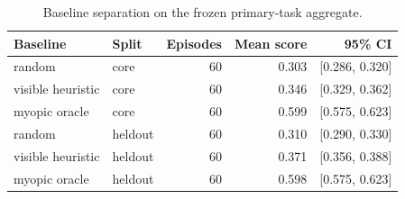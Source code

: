 \begin{table}[t]
  \centering
  \small
  \begin{tabular}{llrrr}
    \toprule
    Baseline & Split & Episodes & Mean score & 95\% CI \\
    \midrule
    random & core & 60 & 0.303 & [0.286, 0.320] \\
    visible heuristic & core & 60 & 0.346 & [0.329, 0.362] \\
    myopic oracle & core & 60 & 0.599 & [0.575, 0.623] \\
    random & heldout & 60 & 0.310 & [0.290, 0.330] \\
    visible heuristic & heldout & 60 & 0.371 & [0.356, 0.388] \\
    myopic oracle & heldout & 60 & 0.598 & [0.575, 0.623] \\
    \bottomrule
  \end{tabular}
  \caption{Baseline separation on the frozen primary-task aggregate.}
  \label{tab:baselines}
\end{table}
